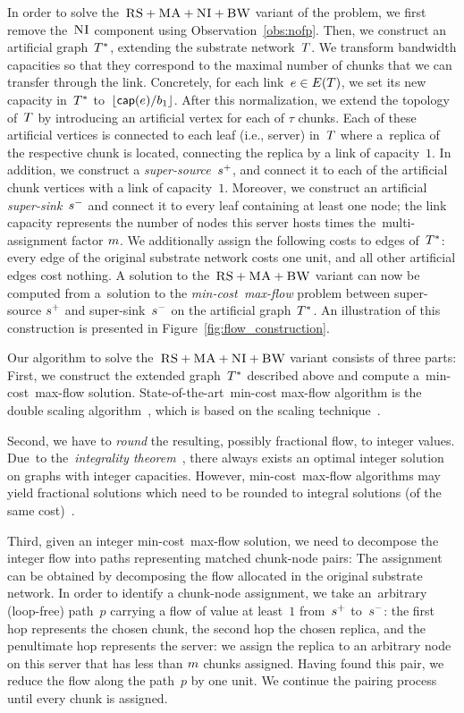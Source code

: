 In order to solve the~$\textsc{RS}+\textsc{MA}+\textsc{NI}+\textsc{BW}$ variant of the {\CTE} problem,
we first remove the~$\textsc{NI}$ component using Observation~\ref{obs:nofp}.
Then, we construct
an artificial graph~$T^*$, extending the substrate network~$T$.
We transform bandwidth capacities so that they correspond to the maximal number of chunks that we can transfer through the link.
Concretely, for each link~$e\in E(T)$, we set its new
capacity in~$T^*$ to~$\lfloor\textsf{cap}(e) / b_1\rfloor$.
After this normalization, we extend the topology of~$T$ by
introducing an artificial vertex for each of $\tau$ chunks. Each of these artificial
vertices is connected to each leaf (i.e., server) in~$T$ where a~replica
 of the respective chunk is located,
connecting the replica by a link of capacity~$1$. In
addition, we construct a
\emph{super-source}~$s^{+}$, and connect it to each of the artificial chunk
vertices with a link of capacity~$1$. Moreover, we construct an artificial \emph{super-sink}~$s^{-}$ and
connect it to every leaf containing at least one node; the link capacity represents
the number of nodes this server hosts times the~multi-assignment factor
$m$.
We additionally assign the following costs to edges of~$T^*$:
every edge of the original substrate network costs one unit, and all other artificial edges
cost nothing.
A solution to the~$\textsc{RS}+\textsc{MA}+\textsc{BW}$ variant can now be computed
from a~solution to the \emph{min-cost~max-flow} problem between super-source
$s^{+}$ and
super-sink~$s^{-}$ on the artificial graph~$T^*$.
An illustration of this construction is presented in Figure~\ref{fig:flow_construction}.

Our algorithm to solve the~$\textsc{RS}+\textsc{MA}+\textsc{NI}+\textsc{BW}$ variant consists of three parts:
First, we construct the extended graph~$T^*$
described above and compute
a~min-cost~max-flow solution.
State-of-the-art~min-cost max-flow algorithm is the double scaling algorithm~\cite{mincostmaxflow-state}, which is based on the scaling technique~\cite{mincostmaxflow-1,mincostmaxflow-2}.

Second, we have to \emph{round} the resulting, possibly fractional flow, to
integer values. Due~to the~\emph{integrality theorem}~\cite{flow-book},
there always exists an optimal integer solution on graphs with integer capacities.
However, min-cost~max-flow algorithms may yield fractional solutions
which need to be rounded to integral solutions (of the same cost)~\cite{electric-flows}.

Third, given an integer min-cost~max-flow solution, we need to decompose
the integer flow into paths
representing matched chunk-node pairs:
The assignment can be obtained by decomposing the flow allocated in the
original substrate network. In order to identify a chunk-node assignment,
we take an~arbitrary (loop-free) path~$p$ carrying a flow of value at least~$1$ from~$s^{+}$ to~$s^{-}$:
the first hop represents the chosen chunk, the second hop the chosen
replica, and the penultimate hop represents the server: we assign
the replica to an arbitrary node on this server that has less than $m$ chunks assigned.
Having found this pair, we reduce the flow
along the path~$p$ by one unit.
We continue the pairing process until every chunk is assigned.

